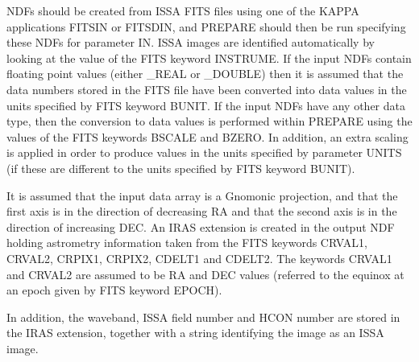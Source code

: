 \begin{small}
{{   }{
      NDFs should be created from ISSA FITS files using one of the
      KAPPA applications FITSIN or FITSDIN, and PREPARE should then be
      run specifying these NDFs for parameter IN. ISSA images are
      identified automatically by looking at the value of the FITS
      keyword INSTRUME. If the input NDFs contain floating point values
      (either \_REAL or \_DOUBLE) then it is assumed that the data
      numbers stored in the FITS file have been converted into data
      values in the units specified by FITS keyword BUNIT. If the input
      NDFs have any other data type, then the conversion to data values
      is performed within PREPARE using the values of the FITS keywords
      BSCALE and BZERO.  In addition, an extra scaling is applied in
      order to produce values in the units specified by parameter UNITS
      (if these are different to the units specified by FITS keyword
      BUNIT).

      It is assumed that the input data array is a Gnomonic projection,
      and that the first axis is in the direction of decreasing RA and
      that the second axis is in the direction of increasing DEC. An
      IRAS extension is created in the output NDF holding astrometry
      information taken from the FITS keywords CRVAL1, CRVAL2, CRPIX1,
      CRPIX2, CDELT1 and CDELT2. The keywords CRVAL1 and CRVAL2 are
      assumed to be RA and DEC values (referred to the equinox at an
      epoch given by FITS keyword EPOCH).

      In addition, the waveband, ISSA field number and HCON number are
      stored in the IRAS extension, together with a string identifying
      the image as an ISSA image.
   }
   }
\end{small}
